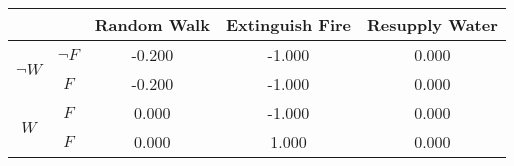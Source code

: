 \begin{center}
\begin{tabular}{|c|c|c|c|c|}
  \hline
  &   & Random Walk & Extinguish Fire & Resupply Water\\
  \hline
  \multirow{2}{*}{$\neg W$} & $\neg F$ & -0.200 & -1.000 & 0.000\\
  \cline{2-5}
   & $F$ & -0.200 & -1.000 & 0.000\\
  \hline
  \multirow{2}{*}{$W$} & $F$ & 0.000 & -1.000 & 0.000\\
  \cline{2-5}
   & $F$ & 0.000 & 1.000 & 0.000\\
  \hline
\end{tabular}
\end{center}
